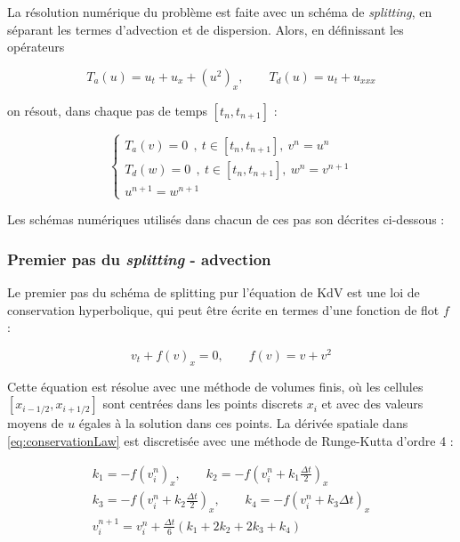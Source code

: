 \indent La résolution numérique du problème est faite avec un schéma de \emph{splitting}, en séparant les termes d'advection et de dispersion. Alors, en définissant les opérateurs

\begin{equation*}
	T_a(u) = u_t + u_x + (u^2)_x, \qquad
	T_d(u) = u_t + u_{xxx}
\end{equation*}

 \noindent on résout, dans chaque pas de temps $[t_n,t_{n+1}]$ :
 
\begin{equation*}
\begin{cases}
   T_a(v) = 0 \ \ ,\ t \in [t_n,t_{n+1}], \  v^n = u^n \\
   T_d(w) = 0 \ \ , \ t \in [t_n,t_{n+1}], \  w^n = v^{n+1} \\
    u^{n+1} = w^{n+1}
\end{cases}
\end{equation*}

\indent Les schémas numériques utilisés dans chacun de ces pas son décrites ci-dessous :

\subsubsection{Premier pas du \emph{splitting} - advection}
\label{sec:KdVSplitted1}

\indent Le premier pas du schéma de splitting pur l'équation de KdV est une loi de conservation hyperbolique, qui peut être écrite en termes d'une fonction de flot $f$ :

\begin{equation}
  \label{eq:conservationLaw}
	v_t + f(v)_x = 0,  \qquad f(v) = v + v^2
\end{equation}

\indent Cette équation est résolue avec une méthode de volumes finis, où les cellules $[x_{i-1/2}, x_{i+1/2}]$ sont centrées dans les points discrets $x_i$ et avec des valeurs moyens de $u$ égales à la solution dans ces points. La dérivée spatiale dans \eqref{eq:conservationLaw} est discretisée avec une méthode de Runge-Kutta d'ordre 4 :

\begin{equation*}
\begin{gathered}
k_1 = - f(v_i^n)_x, \qquad
k_2 = - f\left(v_i^n + k_1\frac{\Delta t }{2}\right)_x \\
k_3 = - f\left(v_i^n + k_2\frac{\Delta t }{2}\right)_x, \qquad
k_4 = - f(v_i^n + k_3 \Delta t)_x \\
v_i^{n+1} = v_i^n + \frac{\Delta t}{6}(k_1 + 2k_2 + 2k_3 + k_4)
\end{gathered}
\end{equation*}


